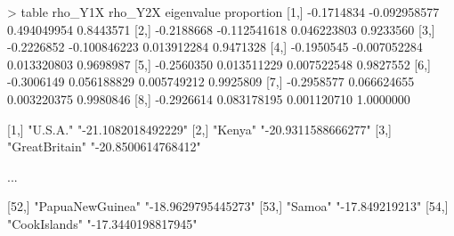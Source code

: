 \begin{rc}

> table
        rho_Y1X      rho_Y2X  eigenvalue proportion
[1,] -0.1714834 -0.092958577 0.494049954  0.8443571
[2,] -0.2188668 -0.112541618 0.046223803  0.9233560
[3,] -0.2226852 -0.100846223 0.013912284  0.9471328
[4,] -0.1950545 -0.007052284 0.013320803  0.9698987
[5,] -0.2560350  0.013511229 0.007522548  0.9827552
[6,] -0.3006149  0.056188829 0.005749212  0.9925809
[7,] -0.2958577  0.066624655 0.003220375  0.9980846
[8,] -0.2926614  0.083178195 0.001120710  1.0000000

 [1,] "U.S.A."         "-21.1082018492229"
 [2,] "Kenya"          "-20.9311588666277"
 [3,] "GreatBritain"   "-20.8500614768412"

 ...

[52,] "PapuaNewGuinea" "-18.9629795445273"
[53,] "Samoa"          "-17.849219213"    
[54,] "CookIslands"    "-17.3440198817945"
\end{rc}


\newpage
